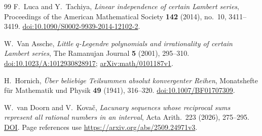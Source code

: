 \documentclass[11pt]{article}
\begin{document}
\begin{thebibliography}{99}
F.~Luca and Y.~Tachiya,
\emph{Linear independence of certain Lambert series},
Proceedings of the American Mathematical Society \textbf{142} (2014), no.~10, 3411--3419.
\href{https://doi.org/10.1090/S0002-9939-2014-12102-2}{doi:10.1090/S0002-9939-2014-12102-2}.

W.~Van Assche,
\emph{Little $q$-Legendre polynomials and irrationality of certain Lambert series},
The Ramanujan Journal \textbf{5} (2001), 295--310.
\href{https://doi.org/10.1023/A:1012930828917}{doi:10.1023/A:1012930828917};
\href{https://arxiv.org/abs/math/0101187v1}{arXiv:math/0101187v1}.

H.~Hornich,
\emph{\"Uber beliebige Teilsummen absolut konvergenter Reihen},
Monatshefte f\"ur Mathematik und Physik \textbf{49} (1941), 316--320.
\href{https://doi.org/10.1007/BF01707309}{doi:10.1007/BF01707309}.


 W.~van Doorn and V.~Kova\v{c},
  \emph{Lacunary sequences whose reciprocal sums represent all rational
  numbers in an interval}, Acta Arith.\ 223 (2026), 275--295.
  \href{https://doi.org/10.4064/aa251001-13-1}{DOI}.
  Page references use \url{https://arxiv.org/abs/2509.24971v3}.

\end{thebibliography}
\endgroup
\end{document}
